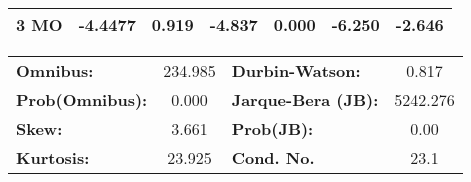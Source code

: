 \begin{center}
\begin{tabular}{lcccccc}
\textbf{3 MO}      &      -4.4477  &        0.919     &    -4.837  &         0.000        &       -6.250    &       -2.646     \\
\bottomrule
\end{tabular}
\begin{tabular}{lclc}
\textbf{Omnibus:}       & 234.985 & \textbf{  Durbin-Watson:     } &    0.817  \\
\textbf{Prob(Omnibus):} &   0.000 & \textbf{  Jarque-Bera (JB):  } & 5242.276  \\
\textbf{Skew:}          &   3.661 & \textbf{  Prob(JB):          } &     0.00  \\
\textbf{Kurtosis:}      &  23.925 & \textbf{  Cond. No.          } &     23.1  \\
\bottomrule
\end{tabular}
\end{center}

